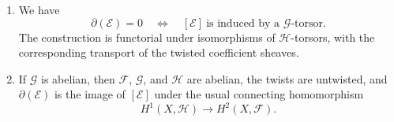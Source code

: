 \begin{lemma}
\begin{enumerate}
isomorphism
$$
\delta_{\mathcal Q,\alpha}:
H^1\bigl(X,(\mathcal F')^{\mathcal Q}\bigr)
\longrightarrow H^2(X,\mathcal F^{\mathcal E}).
$$
The element
$$
\partial(\mathcal E)=
\delta_{\mathcal Q,\alpha}\bigl(d_u(\mathcal Q)\bigr)
\in H^2(X,\mathcal F^{\mathcal E})
$$
is independent of the choice of $(\mathcal Q,\alpha)$.
\item We have
$$
\partial(\mathcal E)=0
\quad\Longleftrightarrow\quad
[\mathcal E]\ \text{is induced by a }\mathcal G\text{-torsor}.
$$
The construction is functorial under isomorphisms of
$\mathcal H$-torsors, with the corresponding transport of the twisted
coefficient sheaves.
\item If $\mathcal G$ is abelian, then $\mathcal F$, $\mathcal G$, and
$\mathcal H$ are abelian, the twists are untwisted, and
$\partial(\mathcal E)$ is the image of $[\mathcal E]$ under the usual
connecting homomorphism
$$
H^1(X,\mathcal H)\longrightarrow H^2(X,\mathcal F).
$$
\end{enumerate}
\end{lemma}

